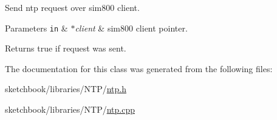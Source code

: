 Send ntp request over sim800 client. 


\begin{DoxyParams}[1]{Parameters}
\mbox{\tt in}  & {\em $\ast$client} & sim800 client pointer. \\
\hline
\end{DoxyParams}
\begin{DoxyReturn}{Returns}
true if request was sent. 
\end{DoxyReturn}


The documentation for this class was generated from the following files\+:\begin{DoxyCompactItemize}
\item 
sketchbook/libraries/\+N\+T\+P/\hyperlink{ntp_8h}{ntp.\+h}\item 
sketchbook/libraries/\+N\+T\+P/\hyperlink{ntp_8cpp}{ntp.\+cpp}\end{DoxyCompactItemize}
